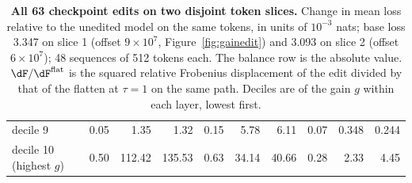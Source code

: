 \begin{table}[H]
\begin{tabular}{@{}l rrr rrr rrr@{}}
decile 9 & 0.05 & 1.35 & 1.32 & 0.15 & 5.78 & 6.11 & 0.07 & 0.348 & 0.244 \\
decile 10 (highest $g$) & 0.50 & 112.42 & 135.53 & 0.63 & 34.14 & 40.66 & 0.28 & 2.33 & 4.45 \\
\bottomrule
\end{tabular}
\caption{\textbf{All 63 checkpoint edits on two disjoint token slices.} Change in mean loss relative to the unedited model on the same tokens, in units of $10^{-3}$ nats; base loss 3.347 on slice 1 (offset $9\times10^7$, Figure~\ref{fig:gainedit}) and 3.093 on slice 2 (offset $6\times10^7$); 48 sequences of 512 tokens each. The balance row is the absolute value. $\dF/\dF^{\mathrm{flat}}$ is the squared relative Frobenius displacement of the edit divided by that of the flatten at $\tau=1$ on the same path. Deciles are of the gain $g$ within each layer, lowest first.}
\label{tab:gainedit_full}
\end{table}

